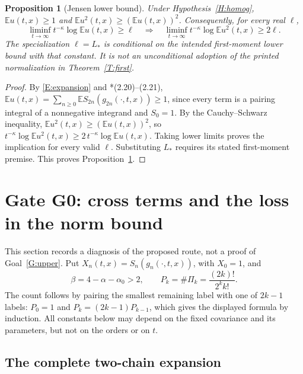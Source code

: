 \documentclass[12pt]{article}
\numberwithin{equation}{section}
\newtheorem{proposition}[theorem]{Proposition}
\theoremstyle{definition}
\newcommand{\E}{\mathbb{E}}
\begin{document}
\begin{proposition}[Jensen lower bound]\label{P:Jensen}
  Under Hypothesis~\ref{H:homog}, $\E u(t,x)\ge1$ and
  $\E u^2(t,x)\ge(\E u(t,x))^2$. Consequently, for every real $\ell$,
  \[
    \liminf_{t\to\infty}t^{-\kappa}\log\E u(t,x)\ge\ell
    \quad\Longrightarrow\quad
    \liminf_{t\to\infty}t^{-\kappa}\log\E u^2(t,x)\ge2\ell.
  \]
  The specialization $\ell=L_*$ is conditional on the intended
  first-moment lower bound with that constant. It is not an unconditional
  adoption of the printed normalization in Theorem~\ref{T:first}.
\end{proposition}

\begin{proof}
  By \eqref{E:expansion} and \cite{chen:author2026:time-dependency}*{(2.20)--(2.21)},
  $\E u(t,x)=\sum_{n\ge0}\E S_{2n}(g_{2n}(\cdot,t,x))\ge1$, since every term is
  a pairing integral of a nonnegative integrand and $S_0=1$. By the
  Cauchy--Schwarz inequality, $\E u^2(t,x)\ge(\E u(t,x))^2$, so
  $t^{-\kappa}\log\E u^2(t,x)\ge2\,t^{-\kappa}\log\E u(t,x)$.
  Taking lower limits proves the implication for every valid $\ell$.
  Substituting $L_*$ requires its stated first-moment premise.
  This proves Proposition~\ref{P:Jensen}.
\end{proof}

\section{Gate G0: cross terms and the loss in the norm bound}\label{S:G0}

This section records a diagnosis of the proposed route, not a proof of
Goal~\ref{G:upper}. Put $X_n(t,x)=S_n(g_n(\cdot,t,x))$, with $X_0=1$, and
\[
  \beta=4-\alpha-\alpha_0>2,\qquad
  P_k=\#\Pi_k=\frac{(2k)!}{2^k k!}.
\]
The count follows by pairing the smallest remaining label with one of
$2k-1$ labels: $P_0=1$ and $P_k=(2k-1)P_{k-1}$, which gives the displayed
formula by induction. All constants below may depend on the fixed covariance and its parameters,
but not on the orders or on $t$.

\subsection{The complete two-chain expansion}
\end{document}
